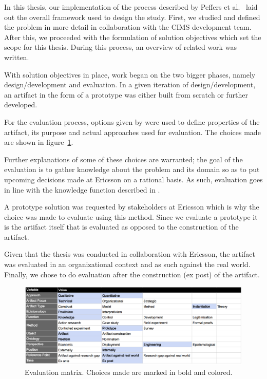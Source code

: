 In this thesis, our implementation of the process described by Peffers et al.\ \cite{Peffers} laid out the overall framework used to design the study. First, we studied and defined the problem in more detail in collaboration with the CIMS development team. After this, we proceeded with the formulation of solution objectives which set the scope for this thesis. During this process, an overview of related work was written.

With solution objectives in place, work began on the two bigger phases, namely design/development and evaluation. In a given iteration of design/development, an artifact in the form of a prototype was either built from scratch or further developed.

For the evaluation process, options given by \cite{DesignEval} were used to define properties of the artifact, its purpose and actual approaches used for evaluation. The choices made are shown in figure~\ref{fig:matrix}.

Further explanations of some of these choices are warranted; the goal of the evaluation is to gather knowledge about the problem and its domain so as to put upcoming decisions made at Ericsson on a rational basis. As such, evaluation goes in line with the knowledge function described in \cite{DesignEval}. 

A prototype solution was requested by stakeholders at Ericsson which is why the choice was made to evaluate using this method. Since we evaluate a prototype it is the artifact itself that is evaluated as opposed to the construction of the artifact.

Given that the thesis was conducted in collaboration with Ericsson, the artifact was evaluated in an organizational context and as such against the real world. Finally, we chose to do evaluation after the construction (ex post) of the artifact.

\begin{figure}[h!]
\centering
\includegraphics[width=0.7\pdfpagewidth]{figure/eval.png}
\caption{Evaluation matrix. Choices made are marked in bold and colored.}
\label{fig:matrix}
\end{figure}


